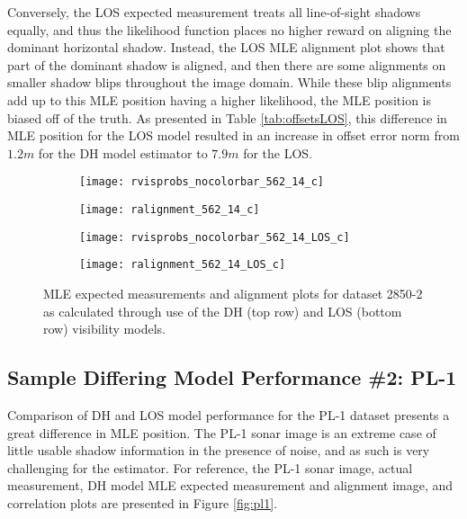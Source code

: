 Conversely, the LOS expected measurement treats all line-of-sight shadows equally, and thus the likelihood function places no higher reward on aligning the dominant horizontal shadow.  
Instead, the LOS MLE alignment plot shows that part of the dominant shadow is aligned, and then there are some alignments on smaller shadow blips throughout the image domain.
While these blip alignments add up to this MLE position having a higher likelihood, the MLE position is biased off of the truth.
As presented in Table \ref{tab:offsetsLOS}, this difference in MLE position for the LOS model resulted in an increase in offset error norm from $1.2m$ for the DH model estimator to $7.9m$ for the LOS.

\begin{figure} [h!]
	\centering
	\begin{subfigure}[b]{0.48\textwidth}
                \texttt{[image: rvisprobs\_nocolorbar\_562\_14\_c]}
                \caption{}
	\end{subfigure}
  	\centering
	\begin{subfigure}[b]{0.48\textwidth}
                \texttt{[image: ralignment\_562\_14\_c]}
		\caption{}
  	\end{subfigure}
  	
  	\centering
	\begin{subfigure}[b]{0.48\textwidth}
                \texttt{[image: rvisprobs\_nocolorbar\_562\_14\_LOS\_c]}
		\caption{}
  	\end{subfigure}
  	\centering
	\begin{subfigure}[b]{0.48\textwidth}
                \texttt{[image: ralignment\_562\_14\_LOS\_c]}
		\caption{}
  	\end{subfigure}
  	
	\caption{MLE expected measurements and alignment plots for dataset 2850-2 as calculated through use of the DH (top row) and LOS (bottom row) visibility models.}
	\label{fig:los2}
\end{figure}


\subsection{Sample Differing Model Performance \#2: PL-1}
\label{rov.LOS.PL1}

Comparison of DH and LOS model performance for the PL-1 dataset presents a great difference in MLE position.
The PL-1 sonar image is an extreme case of little usable shadow information in the presence of noise, and as such is very challenging for the estimator.
For reference, the PL-1 sonar image, actual measurement, DH model MLE expected measurement and alignment image, and correlation plots are presented in Figure \ref{fig:pl1}.

